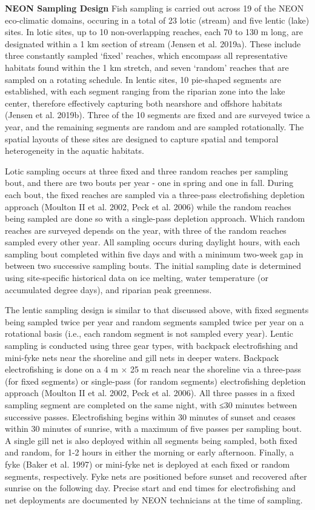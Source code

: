 \documentclass[
  12pt,
]{article}
\begin{document}
\textbf{NEON Sampling Design} Fish sampling is carried out across 19 of the NEON eco-climatic domains, occuring in a total of 23 lotic (stream) and five lentic (lake) sites. In lotic sites, up to 10 non-overlapping reaches, each 70 to 130 m long, are designated within a 1 km section of stream (Jensen et al. 2019a). These include three constantly sampled `fixed' reaches, which encompass all representative habitats found within the 1 km stretch, and seven `random' reaches that are sampled on a rotating schedule. In lentic sites, 10 pie-shaped segments are established, with each segment ranging from the riparian zone into the lake center, therefore effectively capturing both nearshore and offshore habitats (Jensen et al. 2019b). Three of the 10 segments are fixed and are surveyed twice a year, and the remaining segments are random and are sampled rotationally. The spatial layouts of these sites are designed to capture spatial and temporal heterogeneity in the aquatic habitats.

Lotic sampling occurs at three fixed and three random reaches per sampling bout, and there are two bouts per year - one in spring and one in fall. During each bout, the fixed reaches are sampled via a three-pass electrofishing depletion approach (Moulton II et al. 2002, Peck et al. 2006) while the random reaches being sampled are done so with a single-pass depletion approach. Which random reaches are surveyed depends on the year, with three of the random reaches sampled every other year. All sampling occurs during daylight hours, with each sampling bout completed within five days and with a minimum two-week gap in between two successive sampling bouts. The initial sampling date is determined using site-specific historical data on ice melting, water temperature (or accumulated degree days), and riparian peak greenness.

The lentic sampling design is similar to that discussed above, with fixed segments being sampled twice per year and random segments sampled twice per year on a rotational basis (i.e., each random segment is not sampled every year). Lentic sampling is conducted using three gear types, with backpack electrofishing and mini-fyke nets near the shoreline and gill nets in deeper waters. Backpack electrofishing is done on a 4 m \(\times\) 25 m reach near the shoreline via a three-pass (for fixed segments) or single-pass (for random segments) electrofishing depletion approach (Moulton II et al. 2002, Peck et al. 2006). All three passes in a fixed sampling segment are completed on the same night, with ≤30 minutes between successive passes. Electrofishing begins within 30 minutes of sunset and ceases within 30 minutes of sunrise, with a maximum of five passes per sampling bout. A single gill net is also deployed within all segments being sampled, both fixed and random, for 1-2 hours in either the morning or early afternoon. Finally, a fyke (Baker et al. 1997) or mini-fyke net is deployed at each fixed or random segments, respectively. Fyke nets are positioned before sunset and recovered after sunrise on the following day. Precise start and end times for electrofishing and net deployments are documented by NEON technicians at the time of sampling.
\end{document}
